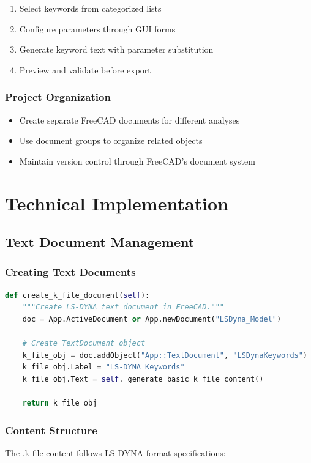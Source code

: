 \documentclass[12pt,a4paper]{article}
\begin{document}
\begin{enumerate}
    \item Select keywords from categorized lists
    \item Configure parameters through GUI forms
    \item Generate keyword text with parameter substitution
    \item Preview and validate before export
\end{enumerate}

\subsubsection{Project Organization}
\begin{itemize}
    \item Create separate FreeCAD documents for different analyses
    \item Use document groups to organize related objects
    \item Maintain version control through FreeCAD's document system
\end{itemize}

\section{Technical Implementation}

\subsection{Text Document Management}

\subsubsection{Creating Text Documents}
\begin{lstlisting}[language=Python, caption=Text document creation]
def create_k_file_document(self):
    """Create LS-DYNA text document in FreeCAD."""
    doc = App.ActiveDocument or App.newDocument("LSDyna_Model")

    # Create TextDocument object
    k_file_obj = doc.addObject("App::TextDocument", "LSDynaKeywords")
    k_file_obj.Label = "LS-DYNA Keywords"
    k_file_obj.Text = self._generate_basic_k_file_content()

    return k_file_obj
\end{lstlisting}

\subsubsection{Content Structure}
The .k file content follows LS-DYNA format specifications:
\end{document}
